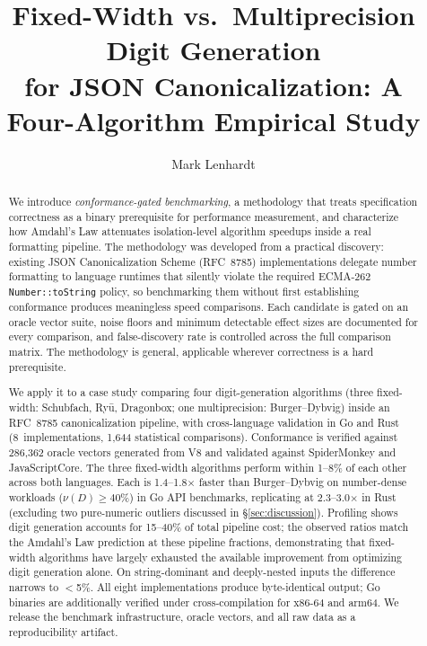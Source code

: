 \documentclass[12pt]{article}
\newcommand{\schubfach}{Schubfach\xspace}
\newcommand{\burgerdybvig}{Burger--Dybvig\xspace}
\newcommand{\ryualg}{Ry\=u\xspace}
\newcommand{\dragonbox}{Dragonbox\xspace}
\theoremstyle{definition}
\theoremstyle{remark}
\begin{document}
\title{Fixed-Width vs.\ Multiprecision Digit Generation\\for JSON Canonicalization: A Four-Algorithm Empirical Study}

\author{Mark Lenhardt}
\date{}

\maketitle

\begin{abstract}
We introduce \emph{conformance-gated benchmarking}, a methodology
that treats specification correctness as a binary prerequisite for
performance measurement, and characterize how Amdahl's Law attenuates
isolation-level algorithm speedups inside a real formatting pipeline.
The methodology was developed from a practical discovery: existing
JSON Canonicalization Scheme (RFC~8785) implementations delegate
number formatting to language runtimes that silently violate the
required ECMA-262 \texttt{Number::toString} policy, so benchmarking
them without first establishing conformance produces meaningless
speed comparisons.  Each candidate is gated on an oracle vector suite,
noise floors and minimum detectable effect sizes are documented for
every comparison, and false-discovery rate is controlled across the
full comparison matrix.  The methodology is general, applicable
wherever correctness is a hard prerequisite.

We apply it to a case study comparing four digit-generation algorithms
(three fixed-width: \schubfach, \ryualg, \dragonbox; one
multiprecision: \burgerdybvig) inside an RFC~8785 canonicalization
pipeline, with cross-language validation in Go and Rust
(8~implementations, 1{,}644 statistical comparisons).  Conformance is
verified against 286{,}362 oracle vectors generated from V8 and
validated against SpiderMonkey and JavaScriptCore.  The three
fixed-width algorithms perform within 1--8\% of each other across
both languages.  Each is 1.4--1.8$\times$ faster than \burgerdybvig
on number-dense workloads ($\nu(D) \geq 40\%$) in Go API benchmarks,
replicating at 2.3--3.0$\times$ in Rust (excluding two pure-numeric
outliers discussed in \S\ref{sec:discussion}).  Profiling shows digit
generation accounts for 15--40\% of total pipeline cost; the observed
ratios match the Amdahl's Law prediction at these pipeline fractions,
demonstrating that fixed-width algorithms have largely exhausted the
available improvement from optimizing digit generation alone.  On
string-dominant and deeply-nested inputs the difference narrows to
$<$5\%.  All eight implementations produce byte-identical output; Go
binaries are additionally verified under cross-compilation for x86-64
and arm64.  We release the benchmark infrastructure, oracle vectors,
and all raw data as a reproducibility artifact.
\end{abstract}
\end{document}
